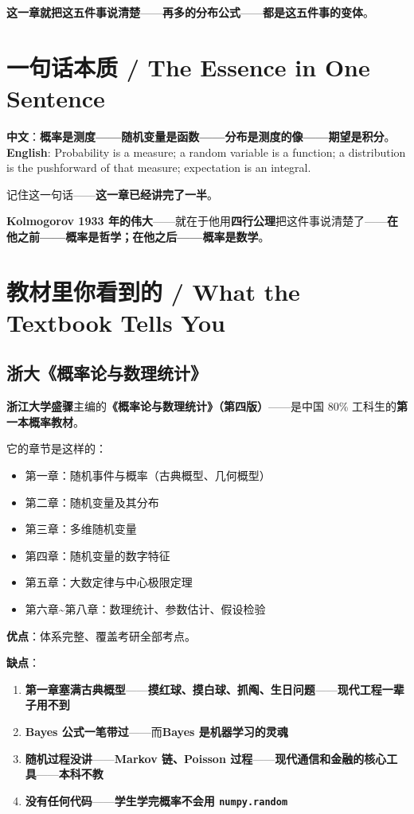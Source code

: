 \textbf{这一章就把这五件事说清楚}——\textbf{再多的分布公式}——\textbf{都是这五件事的变体}。

\section{一句话本质 / The Essence in One Sentence}

\begin{tcolorbox}[essbox={一句话本质}]
\textbf{中文}：\textbf{概率是测度——随机变量是函数——分布是测度的像——期望是积分}。\\[6pt]
\textbf{English}: Probability is a measure; a random variable is a function; a distribution is the pushforward of that measure; expectation is an integral.
\end{tcolorbox}

记住这一句话——\textbf{这一章已经讲完了一半}。

\textbf{Kolmogorov 1933 年的伟大}——就在于他用\textbf{四行公理}把这件事说清楚了——\textbf{在他之前——概率是哲学；在他之后——概率是数学}。

\section{教材里你看到的 / What the Textbook Tells You}

\subsection{浙大《概率论与数理统计》}

\textbf{浙江大学盛骤}主编的\textbf{《概率论与数理统计》（第四版）}——是中国 80\% 工科生的\textbf{第一本概率教材}。

它的章节是这样的：

\begin{itemize}
\item 第一章：随机事件与概率（古典概型、几何概型）
\item 第二章：随机变量及其分布
\item 第三章：多维随机变量
\item 第四章：随机变量的数字特征
\item 第五章：大数定律与中心极限定理
\item 第六章\textasciitilde 第八章：数理统计、参数估计、假设检验
\end{itemize}

\textbf{优点}：体系完整、覆盖考研全部考点。

\textbf{缺点}：

\begin{enumerate}
\item \textbf{第一章塞满古典概型}——\textbf{摸红球、摸白球、抓阄、生日问题}——\textbf{现代工程一辈子用不到}
\item \textbf{Bayes 公式一笔带过}——而\textbf{Bayes 是机器学习的灵魂}
\item \textbf{随机过程没讲}——\textbf{Markov 链、Poisson 过程}——\textbf{现代通信和金融的核心工具}——\textbf{本科不教}
\item \textbf{没有任何代码}——\textbf{学生学完概率不会用 \texttt{numpy.random}}
\end{enumerate}

